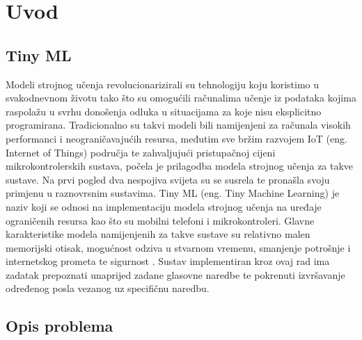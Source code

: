 \chapter{Uvod}
\label{pog:uvod}

\section{Tiny ML}

Modeli strojnog učenja revolucionarizirali su tehnologiju koju koristimo u svakodnevnom
životu tako što su omogućili računalima učenje iz podataka kojima raspolažu u svrhu
donošenja odluka u situacijama za koje nisu eksplicitno programirana. Tradicionalno
su takvi modeli bili namijenjeni za računala visokih performanci i neograničavajućih
resursa, međutim sve bržim razvojem IoT (eng. Internet of Things) područja te
zahvaljujući pristupačnoj cijeni mikrokontrolerskih sustava, počela je prilagodba
modela strojnog učenja za takve sustave. Na prvi pogled dva nespojiva svijeta
su se susrela te pronašla svoju primjenu u raznovrsnim sustavima.
Tiny ML (eng. Tiny Machine Learning) je naziv koji se odnosi na implementaciju
modela strojnog učenja na uređaje ograničenih resursa kao što su mobilni telefoni
i mikrokontroleri. Glavne karakteristike modela namijenjenih za takve sustave su
relativno malen memorijski otisak, mogućnost odziva u stvarnom vremenu,
smanjenje potrošnje i internetskog prometa te sigurnost \cite{tinyml}. Sustav
implementiran kroz ovaj rad ima zadatak prepoznati unaprijed zadane glasovne
naredbe te pokrenuti izvršavanje određenog posla vezanog uz specifičnu naredbu.

\section{Opis problema}

